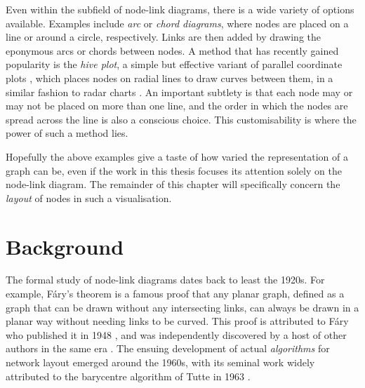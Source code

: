 Even within the subfield of node-link diagrams, there is a wide variety of options available.
Examples include \emph{arc} or \emph{chord diagrams}, where nodes are placed on a line or around a circle, respectively. Links are then added by drawing the eponymous arcs or chords between nodes.
A method that has recently gained popularity is the \emph{hive plot}, a simple but effective variant of parallel coordinate plots \cite{Krzywinski2012}, which places nodes on radial lines to draw curves between them, in a similar fashion to radar charts \cite{Porter2018}. An important subtlety is that each node may or may not be placed on more than one line, and the order in which the nodes are spread across the line is also a conscious choice. This customisability is where the power of such a method lies.

Hopefully the above examples give a taste of how varied the representation of a graph can be, even if the work in this thesis focuses its attention solely on the node-link diagram. The remainder of this chapter will specifically concern the \emph{layout} of nodes in such a visualisation.

\section{Background}
\label{sec:nodes_background}
The formal study of node-link diagrams dates back to least the 1920s. For example, F\'ary's theorem is a famous proof that any planar graph, defined as a graph that can be drawn without any intersecting links, can always be drawn in a planar way without needing links to be curved. This proof is attributed to F\'ary who published it in 1948 \cite{Fary1948}, and was independently discovered by a host of other authors in the same era \cite{Steinitz1922, Wagner1936, Koebe1936, Stein1951}.
The ensuing development of actual \emph{algorithms} for network layout emerged around the 1960s, with its seminal work widely attributed to the barycentre algorithm of Tutte in 1963 \cite{Tutte1963}. 

